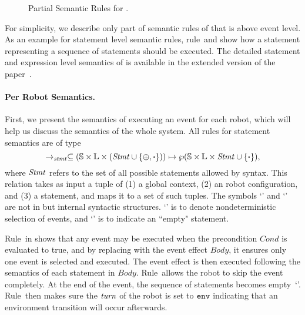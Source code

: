 \begin{figure}
\begin{mathpar}
%
\end{mathpar}
\caption{Partial Semantic Rules for \lgname.}\label{fig:partial-semantics}
\end{figure}

For simplicity, we describe only part of semantic rules of \lgname that is above event level.
As an example for statement level semantic rules,
rule~\StmtSeqRuleOne and \StmtSeqRuleTwo show how a statement representing a sequence of statements should be executed.
The detailed statement and expression level semantics of \lgname is available in the extended version of the paper~\cite{}.

\paragraph{Per Robot Semantics.}
First, we present the semantics of executing an event for each robot,
which will help us discuss the semantics of the whole system.
All rules for statement semantics are of type
\[
\stmtrule \subseteq (\pws \times \pwl\times (\pwstmt \cup \{\SelectEvent, \EndEvent\})) \mapsto \wp(\pws\times \pwl \times \pwstmt\cup \{\EndEvent\}),
\]
where $\pwstmt$ refers to the set of all possible statements allowed by \lgname syntax.
This relation takes as input a tuple of (1) a global context, (2) an robot configuration, and (3) a statement,
and maps it to a set of such tuples.
The symbols `\SelectEvent' and `\EndEvent' are not in \lgname but internal syntactic structures.
`\SelectEvent' is to denote nondeterministic selection of events,
and `\EndEvent' is to indicate an ``empty" statement.

Rule~\SelectEventRule in  shows that any event may be executed when the precondition $Cond$ is evaluated to true,
and by replacing \SelectEvent with the event effect $\mathit{Body}$, it ensures only one event is selected and executed.
The event effect is then executed following the semantics of each statement in $\mathit{Body}$.
Rule~\SkipEventRule allows the robot to skip the event completely.
At the end of the event, the sequence of statements becomes empty~`\EndEvent'.
Rule~\EndEventRule then makes sure the $\turn$ of the robot is set to $\env$ indicating that
an environment transition will occur afterwards.

